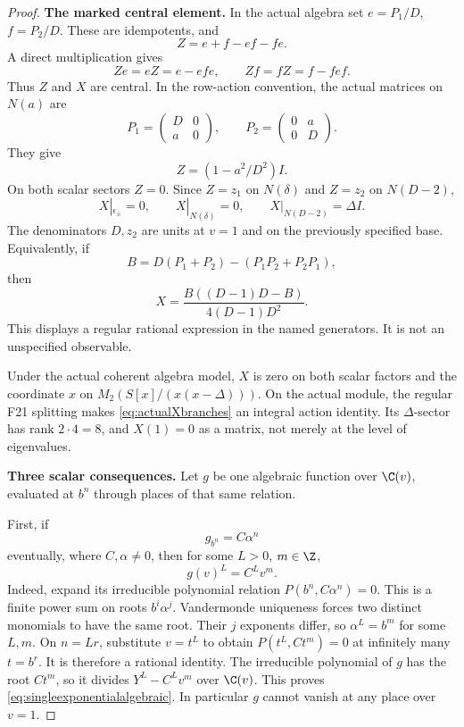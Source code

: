 \documentclass[11pt,a4paper]{article}
\newcommand{\fid}[1]{\textsf{#1}}\newcommand{\gate}[1]{\textsf{#1}}
\theoremstyle{named}\newtheorem{finding}{Finding}[section]
\theoremstyle{definition}\newtheorem{definition}[finding]{Definition}
\theoremstyle{remark}\newtheorem{remark}[finding]{Remark}
\begin{document}
\begin{proof}
\par\smallskip\noindent\textbf{The marked central element.}\quad
In the actual algebra set $e=P_1/D$, $f=P_2/D$.
These are idempotents, and
\[
 Z=e+f-ef-fe.
\]
A direct multiplication gives
\[
 Ze=eZ=e-efe,\qquad Zf=fZ=f-fef.
\]
Thus $Z$ and $X$ are central.
In the row-action convention, the actual matrices on $N(a)$
are
\[
 P_1=\begin{pmatrix}D&0\\a&0\end{pmatrix},\qquad
 P_2=\begin{pmatrix}0&a\\0&D\end{pmatrix}.
\]
They give
\[
 Z=(1-a^2/D^2)I.
\]
On both scalar sectors $Z=0$.
Since $Z=z_1$ on $N(\delta)$ and $Z=z_2$ on $N(D-2)$,
\begin{equation}\label{eq:actualXbranches}
 X|_{\epsilon_\pm}=0,\qquad
 X|_{N(\delta)}=0,\qquad
 X|_{N(D-2)}=\Delta I.
\end{equation}
The denominators $D,z_2$ are units at $v=1$ and on
the previously specified base.
Equivalently, if
\[
 B=D(P_1+P_2)-(P_1P_2+P_2P_1),
\]
then
\[
 X=\frac{B((D-1)D-B)}{4(D-1)D^2}.
\]
This displays a regular rational expression in the named
generators. It is not an unspecified observable.

Under the actual coherent algebra model, $X$ is zero
on both scalar factors and the coordinate $x$ on
$M_2(S[x]/(x(x-\Delta)))$.
On the actual module, the regular \fid{F21} splitting
makes \eqref{eq:actualXbranches} an integral action identity.
Its $\Delta$-sector has rank $2\cdot4=8$, and $X(1)=0$
as a matrix, not merely at the level of eigenvalues.

\par\smallskip\noindent\textbf{Three scalar consequences.}\quad
Let $g$ be one algebraic function over $\C(v)$,
evaluated at $b^n$ through places of that same relation.

First, if
\[
 g_{b^n}=C\alpha^n
\]
eventually, where $C,\alpha\ne0$, then for some
$L>0$, $m\in\Z$,
\begin{equation}\label{eq:singleexponentialalgebraic}
 g(v)^L=C^L v^m.
\end{equation}
Indeed, expand its irreducible polynomial relation
$P(b^n,C\alpha^n)=0$.
This is a finite power sum on roots $b^i\alpha^j$.
Vandermonde uniqueness forces two distinct monomials
to have the same root. Their $j$ exponents differ,
so $\alpha^L=b^m$ for some $L,m$.
On $n=Lr$, substitute $v=t^L$ to obtain
$P(t^L,Ct^m)=0$ at infinitely many $t=b^r$.
It is therefore a rational identity.
The irreducible polynomial of $g$ has the root $Ct^m$,
so it divides $Y^L-C^Lv^m$ over $\C(v)$.
This proves \eqref{eq:singleexponentialalgebraic}.
In particular $g$ cannot vanish at any place over $v=1$.


\end{proof}
\end{document}
